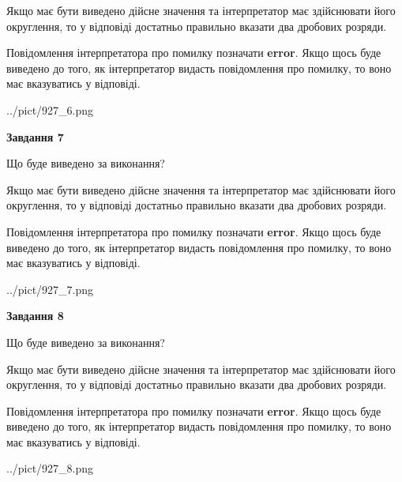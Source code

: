 \documentclass[12pt, ukrainian]{article}
\begin{document}
{\begin {Large}
Якщо має бути виведено дійсне значення та інтерпретатор має здійснювати його округлення, 
то у відповіді достатньо правильно вказати два дробових розряди.

Повідомлення інтерпретатора про помилку позначати \textbf{error}.
Якщо щось буде виведено до того, як інтерпретатор видасть повідомлення про помилку, 
то воно має вказуватись у відповіді. \par

\begin{center}
	{../pict/927_6.png}
\end{center}
\newpage

{\begin {center}\textbf{Завдання 7}\end {center}}\par
Що буде виведено за виконання? \par

Якщо має бути виведено дійсне значення та інтерпретатор має здійснювати його округлення, 
то у відповіді достатньо правильно вказати два дробових розряди.

Повідомлення інтерпретатора про помилку позначати \textbf{error}.
Якщо щось буде виведено до того, як інтерпретатор видасть повідомлення про помилку, 
то воно має вказуватись у відповіді. \par

\begin{center}
	{../pict/927_7.png}
\end{center}
\newpage

{\begin {center}\textbf{Завдання 8}\end {center}}\par
Що буде виведено за виконання? \par

Якщо має бути виведено дійсне значення та інтерпретатор має здійснювати його округлення, 
то у відповіді достатньо правильно вказати два дробових розряди.

Повідомлення інтерпретатора про помилку позначати \textbf{error}.
Якщо щось буде виведено до того, як інтерпретатор видасть повідомлення про помилку, 
то воно має вказуватись у відповіді. \par

\begin{center}
	{../pict/927_8.png}
\end{center}
\newpage


\end{Large}}
\end{document}
